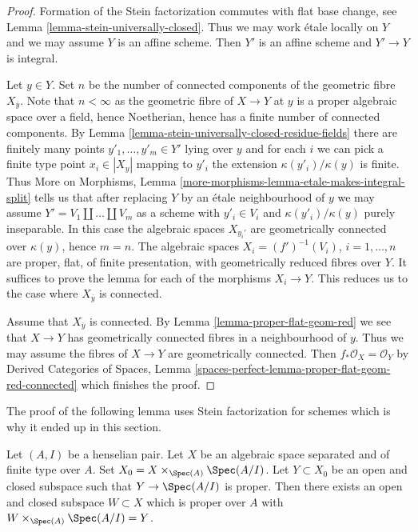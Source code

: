 \begin{proof}
Formation of the Stein factorization commutes with flat base change,
see Lemma \ref{lemma-stein-universally-closed}.
Thus we may work \'etale locally on $Y$ and we may assume $Y$
is an affine scheme. Then $Y'$ is an affine scheme and $Y' \to Y$
is integral.

\medskip\noindent
Let $y \in Y$. Set $n$ be the number of connected components of
the geometric fibre $X_{\overline{y}}$. Note that $n < \infty$
as the geometric fibre of $X \to Y$ at $y$ is a proper
algebraic space over a field, hence Noetherian,
hence has a finite number of connected components.
By Lemma \ref{lemma-stein-universally-closed-residue-fields}
there are finitely many points $y'_1, \ldots, y'_m \in Y'$ lying over $y$
and for each $i$ we can pick a finite type point $x_i \in |X_y|$
mapping to $y'_i$ the extension $\kappa(y'_i)/\kappa(y)$ is finite.
Thus More on Morphisms,
Lemma \ref{more-morphisms-lemma-etale-makes-integral-split}
tells us that after replacing $Y$ by an \'etale neighbourhood
of $y$ we may assume $Y' = V_1 \amalg \ldots \amalg V_m$ as a scheme
with $y'_i \in V_i$ and $\kappa(y'_i)/\kappa(y)$ purely inseparable.
In this case the algebraic spaces $X_{y_i'}$
are geometrically connected over $\kappa(y)$, hence $m = n$.
The algebraic spaces $X_i = (f')^{-1}(V_i)$, $i = 1, \ldots, n$
are proper, flat, of finite presentation, with geometrically
reduced fibres over $Y$. It suffices to prove the lemma
for each of the morphisms $X_i \to Y$. This reduces us to the case where
$X_{\overline{y}}$ is connected.

\medskip\noindent
Assume that $X_{\overline{y}}$ is connected. By
Lemma \ref{lemma-proper-flat-geom-red}
we see that $X \to Y$ has geometrically connected
fibres in a neighbourhood of $y$. Thus
we may assume the fibres of $X \to Y$ are geometrically connected.
Then $f_*\mathcal{O}_X = \mathcal{O}_Y$ by
Derived Categories of Spaces, Lemma
\ref{spaces-perfect-lemma-proper-flat-geom-red-connected}
which finishes the proof.
\end{proof}

\noindent
The proof of the following lemma uses Stein factorization for schemes
which is why it ended up in this section.

\begin{lemma}
\label{lemma-split-off-proper-part-henselian}
Let $(A, I)$ be a henselian pair. Let $X$ be an algebraic space
separated and of finite type over $A$. Set
$X_0 = X \times_{\Spec(A)} \Spec(A/I)$.
Let $Y \subset X_0$ be an open and closed subspace such that
$Y \to \Spec(A/I)$ is proper. Then there exists an open and closed
subspace $W \subset X$ which is proper over $A$ with
$W \times_{\Spec(A)} \Spec(A/I) = Y$.
\end{lemma}

